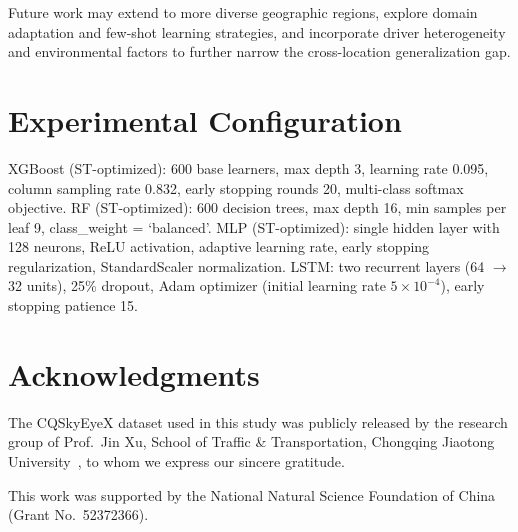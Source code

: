\documentclass[preprint,review,12pt,a4paper]{elsarticle}
\begin{document}
Future work may extend to more diverse geographic regions, explore domain adaptation and few-shot learning strategies, and incorporate driver heterogeneity and environmental factors to further narrow the cross-location generalization gap.

\appendix
\section{Experimental Configuration}
XGBoost (ST-optimized): 600 base learners, max depth 3, learning rate 0.095, column sampling rate 0.832, early stopping rounds 20, multi-class softmax objective. RF (ST-optimized): 600 decision trees, max depth 16, min samples per leaf 9, class\_weight = `balanced'. MLP (ST-optimized): single hidden layer with 128 neurons, ReLU activation, adaptive learning rate, early stopping regularization, StandardScaler normalization. LSTM: two recurrent layers (64 $\to$ 32 units), 25\% dropout, Adam optimizer (initial learning rate $5 \times 10^{-4}$), early stopping patience 15.

\section*{Acknowledgments}
The CQSkyEyeX dataset used in this study was publicly released by the research group of Prof.~Jin Xu, School of Traffic \& Transportation, Chongqing Jiaotong University~\cite{C17}, to whom we express our sincere gratitude.\par
This work was supported by the National Natural Science Foundation of China (Grant No.~52372366).



\end{document}

